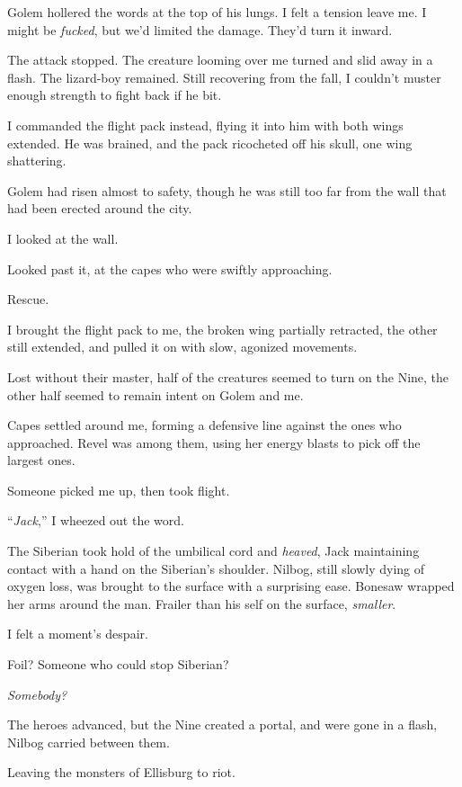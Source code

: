 Golem hollered the words at the top of his lungs.  I felt a tension leave me.  I might be \emph{fucked}, but we'd limited the damage.  They'd turn it inward.



The attack stopped.  The creature looming over me turned and slid away in a flash.  The lizard-boy remained.  Still recovering from the fall, I couldn't muster enough strength to fight back if he bit.



I commanded the flight pack instead, flying it into him with both wings extended.  He was brained, and the pack ricocheted off his skull, one wing shattering.



Golem had risen almost to safety, though he was still too far from the wall that had been erected around the city.



I looked at the wall.



Looked past it, at the capes who were swiftly approaching.



Rescue.



I brought the flight pack to me, the broken wing partially retracted, the other still extended, and pulled it on with slow, agonized movements.



Lost without their master, half of the creatures seemed to turn on the Nine, the other half seemed to remain intent on Golem and me.



Capes settled around me, forming a defensive line against the ones who approached.  Revel was among them, using her energy blasts to pick off the largest ones.



Someone picked me up, then took flight.



``\emph{Jack},'' I wheezed out the word.



The Siberian took hold of the umbilical cord and \emph{heaved}, Jack maintaining contact with a hand on the Siberian's shoulder.  Nilbog, still slowly dying of oxygen loss, was brought to the surface with a surprising ease.  Bonesaw wrapped her arms around the man.  Frailer than his self on the surface, \emph{smaller}.



I felt a moment's despair.



Foil?  Someone who could stop Siberian?



\emph{Somebody?}



The heroes advanced, but the Nine created a portal, and were gone in a flash, Nilbog carried between them.



Leaving the monsters of Ellisburg to riot.





